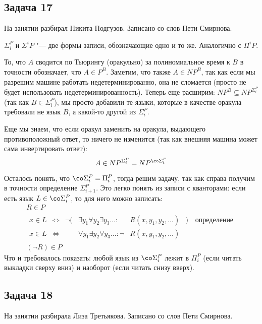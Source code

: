 \subsection{Задача 17}
	На занятии разбирал Никита Подгузов.
	Записано со слов Пети Смирнова.

	\begin{Rem}
		$\Sigma_i^P$ и $\Sigma^i P$ "--- две формы записи, обозначающие одно и то же.
		Аналогично с $\Pi^i P$.
	\end{Rem}

	То, что $A$ сводится по Тьюрингу (оракульно) за полиномиальное время к $B$ в точности обозначает, что $A \in P^B$.
	Заметим, что также $A \in NP^B$, так как если мы разрешим машине работать недетерминированно, она не сломается
	(просто не будет использовать недетерминированность).
	Теперь еще расширим: $NP^B \subseteq NP^{\Sigma_i^P}$ (так как $B \in \Sigma_i^P$), мы просто добавили те языки, которые в качестве
	оракула требовали не язык $B$, а какой-то другой из $\Sigma_i^P$.

	Еще мы знаем, что если оракул заменить на оракула, выдающего противоположный ответ, то ничего не изменится
	(так как внешняя машина	может сама инвертировать ответ):
	\[ A \in NP^{\Sigma_i^P} = NP^{\co\Sigma_i^P} \]

	Осталось понять, что $\co\Sigma_i^P=\Pi_i^P$, тогда решим задачу, так как справа получим в точности определение $\Sigma_{i+1}^P$.
	\label{prob17_quantors}
	Это легко понять из записи с кванторами: если есть язык $L \in \co\Sigma_i^P$, то для него можно записать:
	\begin{gather*}
		R \in P \\
		\begin{alignedat}{3}
		x \in L &\iff& \lnot (&\exists y_1 \forall y_2 \exists y_3 \dots \colon       & R(x, y_1, y_2, \dots)&) \quad \text{определение} \\
		x \in L &\iff&        &\forall y_1 \exists y_2 \forall y_3 \dots \colon \lnot & R(x, y_1, y_2, \dots)&
		\end{alignedat} \\
		(\lnot R) \in P
	\end{gather*}
	Что и требовалось показать: любой язык из $\co\Sigma_i^P$ лежит в $\Pi_i^P$ (если читать выкладки сверху вниз) и наоборот (если читать снизу вверх).

\subsection{Задача 18}
	На занятии разбирала Лиза Третьякова.
	Записано со слов Пети Смирнова.

